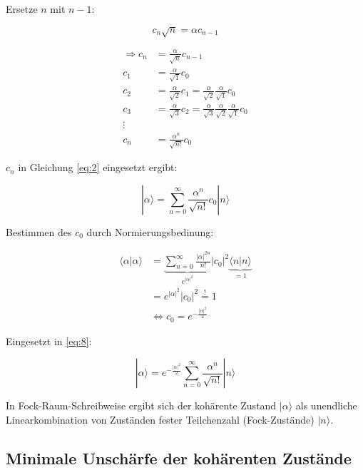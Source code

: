 Ersetze \(n\) mit \(n-1\):

\begin{equation}
  \label{eq:6}
  c_n\sqrt{n} = \alpha c_{n-1}
\end{equation}

\begin{align}
  \label{eq:7}
  \Rightarrow c_n &= \frac{\alpha}{\sqrt{n}}c_{n-1}\\
c_1 &=  \frac{\alpha}{\sqrt{1}}c_{0}\\
c_2 &=  \frac{\alpha}{\sqrt{2}}c_{1} =\frac{\alpha}{\sqrt{2}}\frac{\alpha}{\sqrt{1}}c_{0} \\
c_3 &=  \frac{\alpha}{\sqrt{3}}c_{2} =  \frac{\alpha}{\sqrt{3}} \frac{\alpha}{\sqrt{2}}\frac{\alpha}{\sqrt{1}}c_{0}\\
\vdots\\
c_n &=  \frac{\alpha^n}{\sqrt{n!}}c_{0}
\end{align}

\(c_n\) in Gleichung \eqref{eq:2} eingesetzt ergibt:

\begin{equation}
  \label{eq:8}
  |\alpha\rangle =\sum_{n=0}^{\infty} \frac{\alpha^n}{\sqrt{n!}}c_0 |n\rangle 
\end{equation}

Bestimmen des \(c_0\) durch Normierungsbedinung:

\begin{align}
  \label{eq:9}
  \langle \alpha | \alpha \rangle  &= \underbrace{\sum_{n=0}^{\infty} \frac{|\alpha|^{2n}}{n!}}_{e^{|\alpha|^2}} |c_0|^2 \underbrace{\langle n|n\rangle}_{=1} \\
&= e^{|\alpha|^2}|c_0|^2 \stackrel{!}= 1 \\
 &\Leftrightarrow c_0 = e^{-\frac{|\alpha|^2}{2}} 
\end{align}

Eingesetzt in \eqref{eq:8}:

\begin{equation}
  \label{eq:10}
  \boxed{ |\alpha\rangle =  e^{-\frac{|\alpha|^2}{2}} \sum_{n=0}^{\infty} \frac{\alpha^n}{\sqrt{n!}} |n\rangle }
\end{equation}

In Fock-Raum-Schreibweise ergibt sich der kohärente Zustand \(|\alpha\rangle\) als unendliche Linearkombination von Zuständen fester Teilchenzahl (Fock-Zustände) \(|n\rangle\).


\subsection{Minimale Unschärfe der kohärenten Zustände}

